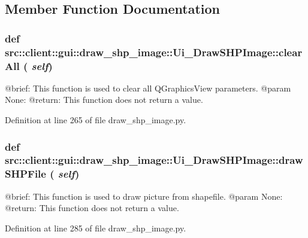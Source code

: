 \subsection{Member Function Documentation}
\hypertarget{classsrc_1_1client_1_1gui_1_1draw__shp__image_1_1Ui__DrawSHPImage_a82815e73e630652959184a3d45d26cef}{
\subsubsection[{clearAll}]{\setlength{\rightskip}{0pt plus 5cm}def src::client::gui::draw\_\-shp\_\-image::Ui\_\-DrawSHPImage::clearAll ( {\em self})}}
\label{classsrc_1_1client_1_1gui_1_1draw__shp__image_1_1Ui__DrawSHPImage_a82815e73e630652959184a3d45d26cef}
\begin{DoxyVerb}
@brief: This function is used to clear all QGraphicsView parameters.
@param None:
@return: This function does not return a value.
\end{DoxyVerb}
 

Definition at line 265 of file draw\_\-shp\_\-image.py.

\hypertarget{classsrc_1_1client_1_1gui_1_1draw__shp__image_1_1Ui__DrawSHPImage_a9f1b5fbf0749b1d93aa4ef62733655b7}{
\subsubsection[{drawSHPFile}]{\setlength{\rightskip}{0pt plus 5cm}def src::client::gui::draw\_\-shp\_\-image::Ui\_\-DrawSHPImage::drawSHPFile ( {\em self})}}
\label{classsrc_1_1client_1_1gui_1_1draw__shp__image_1_1Ui__DrawSHPImage_a9f1b5fbf0749b1d93aa4ef62733655b7}
\begin{DoxyVerb}
@brief: This function is used to draw picture from shapefile.
@param None:
@return: This function does not return a value.
\end{DoxyVerb}
 

Definition at line 285 of file draw\_\-shp\_\-image.py.

